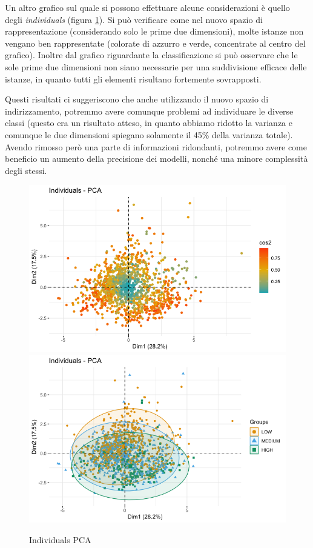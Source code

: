     Un altro grafico sul quale si possono effettuare alcune considerazioni è quello degli \textit{individuals} (figura \ref{fig:out_pcaind}).
    Si può verificare come nel nuovo spazio di rappresentazione (considerando solo le prime due dimensioni), molte istanze non vengano ben rappresentate (colorate di azzurro e verde, concentrate al centro del grafico). Inoltre dal grafico riguardante la classificazione si può osservare che le sole prime due dimensioni non siano necessarie per una suddivisione efficace delle istanze, in quanto tutti gli elementi risultano fortemente sovrapposti. 
    
    Questi risultati ci suggeriscono che anche utilizzando il nuovo spazio di indirizzamento, potremmo avere comunque problemi ad individuare le diverse classi (questo era un risultato atteso, in quanto abbiamo ridotto la varianza e comunque le due dimensioni spiegano solamente il 45\% della varianza totale). Avendo rimosso però una parte di informazioni ridondanti, potremmo avere come beneficio un aumento della precisione dei modelli, nonché una minore complessità degli stessi. 
    
    \vspace{0.6cm}
    \begin{figure}[!h]
        \includegraphics[width=.5\textwidth]{img/individuals_pca_1.png}%
        \qquad
        \includegraphics[width=.5\textwidth]{img/individuals_pca_2.png}
        \caption{Individuals PCA}
        \label{fig:out_pcaind}
    \end{figure}
    
    \newpage

